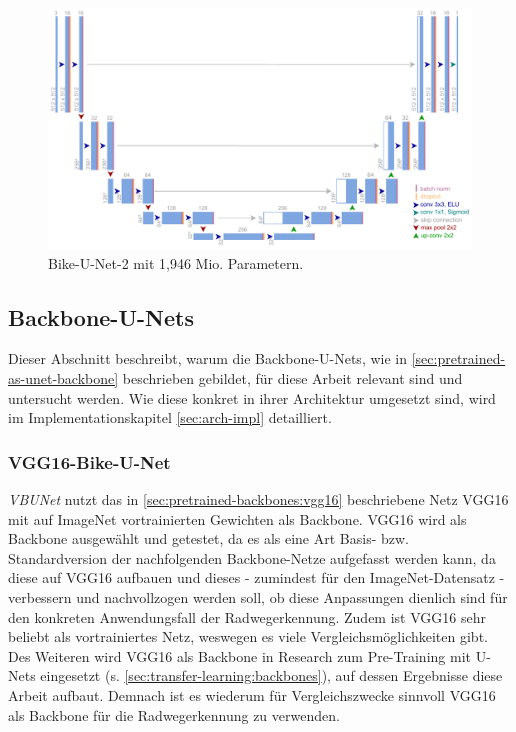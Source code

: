 \begin{figure}
	\centering
	\includegraphics[width=1.\textwidth]{Bilder/own-unet-2mil.pdf} 
	\caption{Bike-U-Net-2 mit 1,946 Mio. Parametern.}
	\label{fig:bike-unet-2}
\end{figure} 


\subsection{Backbone-U-Nets}

Dieser Abschnitt beschreibt, warum die Backbone-U-Nets, wie in \autoref{sec:pretrained-as-unet-backbone} beschrieben gebildet,
für diese Arbeit relevant sind und untersucht werden. Wie diese konkret in ihrer Architektur umgesetzt sind, 
wird im Implementationskapitel \autoref{sec:arch-impl} detailliert.  

\subsubsection{VGG16-Bike-U-Net}

\textit{\ac{VBUNet}} nutzt das in \autoref{sec:pretrained-backbones:vgg16} beschriebene Netz VGG16 
mit auf ImageNet vortrainierten Gewichten als Backbone. 
VGG16 wird als Backbone ausgewählt und getestet, da es als eine Art Basis- bzw. Standardversion der nachfolgenden 
Backbone-Netze aufgefasst werden kann, da diese auf VGG16 aufbauen und dieses - zumindest 
für den ImageNet-Datensatz - verbessern und nachvollzogen werden soll, ob diese Anpassungen dienlich sind 
für den konkreten Anwendungsfall der Radwegerkennung. Zudem ist VGG16 sehr beliebt als vortrainiertes 
Netz, weswegen es viele Vergleichsmöglichkeiten gibt. 
Des Weiteren wird VGG16 als Backbone in Research zum Pre-Training mit U-Nets eingesetzt (s. \autoref{sec:transfer-learning:backbones}), 
auf dessen Ergebnisse diese Arbeit aufbaut. 
Demnach ist es wiederum für Vergleichszwecke sinnvoll VGG16 als Backbone für die Radwegerkennung zu verwenden.   

